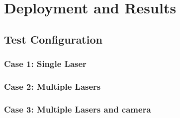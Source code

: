 \chapter[Deployment and Results]{Deployment and Results}

\section{Test Configuration}

\subsection{Case 1: Single Laser}
\subsection{Case 2: Multiple Lasers}
\subsection{Case 3: Multiple Lasers and camera}